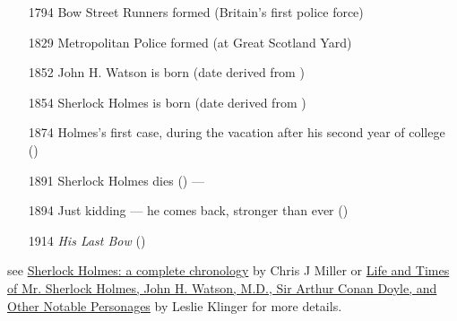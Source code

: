 \documentclass[a4paper,landscape,headrule,footrule,xetex]{foils}
\begin{document}

\begin{itemize}\addtolength{\itemsep}{-1.5ex}
\item [1794]    Bow Street Runners formed (Britain's first police force)
\item [1829]    Metropolitan Police formed (at Great Scotland Yard)
\item [1852] 	John H. Watson is born (date derived from )
\item [1854] 	Sherlock Holmes is born (date derived from )
\item [1874] 	Holmes's first case, during the vacation after his second year of college
()
\item [1891]  Sherlock Holmes dies () --- 
\item [1894]  Just kidding --- he comes back, stronger than ever  ()
\item [1914]  \textit{His Last Bow} 	() 

\end{itemize}
see
\href{http://blog.smartmemes.com/2010/03/sherlock-holmes-a-complete-chronology/}{Sherlock
  Holmes: a complete chronology} by Chris J Miller or
\href{http://webpages.charter.net/lklinger/Chrotabl.htm}{Life and
  Times of Mr. Sherlock Holmes, John H. Watson, M.D., Sir Arthur Conan
  Doyle, and Other Notable Personages} by Leslie Klinger for more
details.


\end{document}
